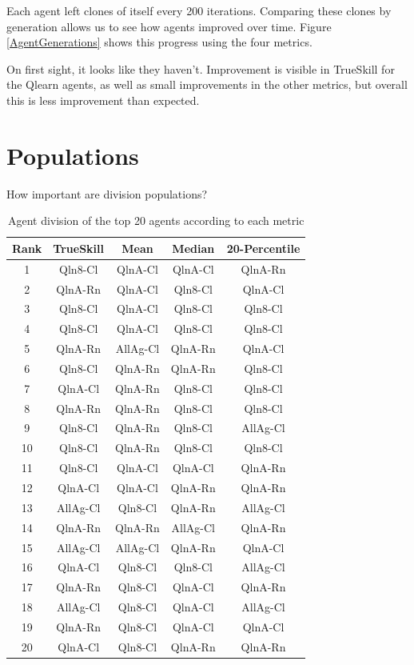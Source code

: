 Each agent left clones of itself every 200 iterations. Comparing these clones by generation allows us to see how agents improved over time. Figure \ref{AgentGenerations} shows this progress using the four metrics.

On first sight, it looks like they haven't. Improvement is visible in TrueSkill for the Qlearn agents, as well as small improvements in the other metrics, but overall this is less improvement than expected.



\section{Populations}

How important are division populations?

\begin{table}[H]
\centering
\begin{tabular}{|| c | c | c | c | c ||} 
 \hline
 Rank & TrueSkill & Mean & Median & 20-Percentile \\ [0.5ex] 
 \hline\hline
   1 &   Qln8-Cl &   QlnA-Cl &   QlnA-Cl &       QlnA-Rn \\
   2 &   QlnA-Rn &   QlnA-Cl &   Qln8-Cl &       QlnA-Cl \\
   3 &   Qln8-Cl &   QlnA-Cl &   Qln8-Cl &       Qln8-Cl \\
   4 &   Qln8-Cl &   QlnA-Cl &   Qln8-Cl &       Qln8-Cl \\
   5 &   QlnA-Rn &  AllAg-Cl &   QlnA-Rn &       QlnA-Cl \\
   6 &   Qln8-Cl &   QlnA-Rn &   QlnA-Rn &       Qln8-Cl \\
   7 &   QlnA-Cl &   QlnA-Rn &   Qln8-Cl &       Qln8-Cl \\
   8 &   QlnA-Rn &   QlnA-Rn &   Qln8-Cl &       Qln8-Cl \\
   9 &   Qln8-Cl &   QlnA-Rn &   Qln8-Cl &      AllAg-Cl \\
  10 &   Qln8-Cl &   QlnA-Rn &   Qln8-Cl &       Qln8-Cl \\
  11 &   Qln8-Cl &   QlnA-Cl &   QlnA-Cl &       QlnA-Rn \\
  12 &   QlnA-Cl &   QlnA-Cl &   QlnA-Rn &       QlnA-Rn \\
  13 &  AllAg-Cl &   Qln8-Cl &   QlnA-Rn &      AllAg-Cl \\
  14 &   QlnA-Rn &   QlnA-Rn &  AllAg-Cl &       QlnA-Rn \\
  15 &  AllAg-Cl &  AllAg-Cl &   QlnA-Rn &       QlnA-Cl \\
  16 &   QlnA-Cl &   Qln8-Cl &   Qln8-Cl &      AllAg-Cl \\
  17 &   QlnA-Rn &   Qln8-Cl &   QlnA-Cl &       QlnA-Rn \\
  18 &  AllAg-Cl &   Qln8-Cl &   QlnA-Cl &      AllAg-Cl \\
  19 &   QlnA-Rn &   Qln8-Cl &   QlnA-Cl &       QlnA-Cl \\
  20 &   QlnA-Cl &   Qln8-Cl &   QlnA-Rn &       QlnA-Rn \\ [1ex] 
 \hline
\end{tabular}
\caption{Agent division of the top 20 agents according to each metric}
\label{DivisionRankings}
\end{table}

